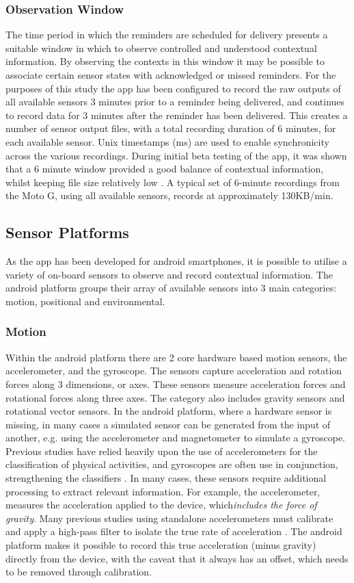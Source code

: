 \subsubsection{Observation Window}
The time period in which the reminders are scheduled for delivery presents a suitable window in which to observe controlled and understood contextual information. By observing the contexts in this window it may be possible to associate certain sensor states with acknowledged or missed reminders.
For the purposes of this study the app has been configured to record the raw outputs of all available sensors 3 minutes prior to a reminder being delivered, and continues to record data for 3 minutes after the reminder has been delivered. This creates a number of sensor output files, with a total recording duration of 6 minutes, for each available sensor.
Unix timestamps (ms) are used to enable synchronicity across the various recordings.
During initial beta testing of the app, it was shown that a 6 minute window provided a good balance of contextual information, whilst keeping file size relatively low \cite{Hartin2014-EMBC}. A typical set of 6-minute recordings from the Moto G, using all available sensors, records at approximately 130KB/min.

\subsection{Sensor Platforms}
As the app has been developed for android smartphones, it is possible to utilise a variety of on-board sensors to observe and record contextual information. The android platform groups their array of available sensors into 3 main categories: motion, positional and environmental.

\subsubsection{Motion}
Within the android platform there are 2 core hardware based motion sensors, the accelerometer, and the gyroscope. The sensors capture acceleration and rotation forces along 3 dimensions, or axes. These sensors measure acceleration forces and rotational forces along three axes. The category also includes gravity sensors and rotational vector sensors.
In the android platform, where a hardware sensor is missing, in many cases a simulated sensor can be generated from the input of another, e.g. using the accelerometer and magnetometer to simulate a gyroscope.
Previous studies have relied heavily upon the use of accelerometers for the classification of physical activities, and gyroscopes are often use in conjunction, strengthening the classifiers \cite{Wu2012, Preece2009}. In many cases, these sensors require additional processing to extract relevant information. For example, the accelerometer, measures the acceleration applied to the device, which\textit{includes the force of gravity}. Many previous studies using standalone accelerometers must calibrate and apply a high-pass filter to isolate the true rate of acceleration \cite{Ferraris1995}. The android platform makes it possible to record this true acceleration (minus gravity) directly from the device, with the caveat that it always has an offset, which needs to be removed through calibration.

